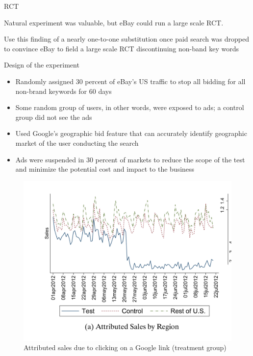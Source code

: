 \documentclass{beamer}
\begin{document}
\begin{frame}{RCT}

  Natural experiment was valuable, but eBay could run a large scale RCT.

  \bigskip


  Use this finding of a nearly one-to-one substitution once paid search was dropped to convince eBay to field a large scale RCT discontinuing non-band key words

  \bigskip


\end{frame}

\begin{frame}{Design of the experiment}

  \begin{itemize}
    \item Randomly assigned 30 percent of eBay's US traffic to stop all bidding for all non-brand keywords for 60 days
    \item Some random group of users, in other words, were exposed to ads; a control group did not see the ads
    \item Used Google's geographic bid feature that can accurately identify geographic market of the user conducting the search
    \item Ads were suspended in 30 percent of markets to reduce the scope of the test and minimize the potential cost and impact to the business
  \end{itemize}

\end{frame}

\begin{frame}

  \begin{figure}
    \begin{center}
      \includegraphics[scale=0.2]{./lecture_includes/tadelis_fig3.png}
      \caption{Attributed sales due to clicking on a Google link (treatment group)}
    \end{center}
  \end{figure}

\end{frame}
\end{document}
